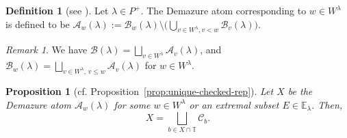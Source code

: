 \documentclass[reqno]{amsart}
\newtheorem{proposition}[theorem]{Proposition}
\theoremstyle{definition}
\newtheorem{definition}[theorem]{Definition}
\theoremstyle{remark}
\newtheorem{remark}[theorem]{Remark}
\numberwithin{equation}{section}
\newcommand{\B}{\mathcal{B}}
\newcommand{\Tfix}{\mathbb{T}}
\newcommand{\Bl}{\B(\lambda)}
\begin{document}
	\begin{definition}[{see \cite{mason2009}
    \cite{assafgonzalez2025}}]\label{def:demazureatom}
		Let $\lambda\in P^+$.
		The Demazure atom corresponding to $w\in W^\lambda$ is defined to be $\mathcal{A}_w(\lambda):=\B_w(\lambda)\setminus\bigl(\bigcup_{v\in W^\lambda,v<w} \B_{v}(\lambda)\bigr)$.
	\end{definition}
	\begin{remark}\label{rem:atomblock}
		We have $\Bl=\bigsqcup_{v\in W^\lambda}\mathcal{A}_v(\lambda)$, and $\B_w(\lambda)=\bigsqcup_{v\in W^\lambda,\,v\le w}\mathcal{A}_v(\lambda)$ for $w\in W^\lambda$.
	\end{remark}
	
	\begin{proposition}[cf. Proposition~\ref{prop:unique-checked-rep}]\label{prop:decomp-into-classes}
		Let $X$ be the Demazure atom $\mathcal{A}_w(\lambda)$ for some $w\in W^\lambda$
		or an extremal subset $E\in\mathbb{E}_\lambda$. Then,
		$$X=\bigsqcup_{b\in X\cap\Tfix}\mathcal{C}_b.$$
	\end{proposition}
\end{document}

